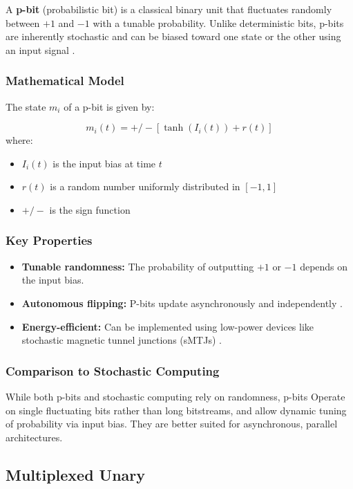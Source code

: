 \documentclass{article}
\begin{document}
A \textbf{p-bit} (probabilistic bit) is a classical binary unit that fluctuates randomly between $+1$ and $-1$ with a tunable probability. Unlike deterministic bits, p-bits are inherently stochastic and can be biased toward one state or the other using an input signal \cite{camsari2017stochastic}.

\subsubsection{Mathematical Model}
The state $m_i$ of a p-bit is given by:

\begin{equation}
	m_i(t) = +/- [\tanh(I_i(t)) + r(t)]
\end{equation}
where:
\begin{itemize}
  \item $I_i(t)$ is the input bias at time $t$
  \item $r(t)$ is a random number uniformly distributed in $[-1, 1]$
  \item $+/-$ is the sign function
\end{itemize}

\subsubsection{Key Properties}
\begin{itemize}
  \item \textbf{Tunable randomness:} The probability of outputting $+1$ or $-1$ depends on the input bias.
  \item \textbf{Autonomous flipping:} P-bits update asynchronously and independently \cite{camsari2019petaflips}.
  \item \textbf{Energy-efficient:} Can be implemented using low-power devices like stochastic magnetic tunnel junctions (sMTJs) \cite{camsari2023fullstack}.
\end{itemize}

\subsubsection{Comparison to Stochastic Computing}
While both p-bits and stochastic computing rely on randomness, p-bits  Operate on single fluctuating bits rather than long bitstreams, and allow dynamic tuning of probability via input bias. They are better suited for asynchronous, parallel architectures.



\subsection{Multiplexed Unary}
\end{document}
